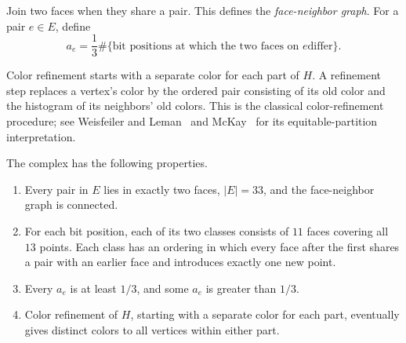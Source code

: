 Join two faces when they share a pair. This defines the
\emph{face-neighbor graph}. For a pair $e\in E$, define
\begin{equation}
 a_e=\frac{1}{3}\#\{\text{bit positions at which the two faces on $e$
 differ}\}.
 \label{eq:complex-separation}
\end{equation}

Color refinement starts with a separate color for each part of $H$.
A refinement step replaces a vertex's color by the ordered pair
consisting of its old color and the histogram of its neighbors' old
colors. This is the classical color-refinement procedure; see
Weisfeiler and Leman~\cite{weisfeilerleman1968} and
McKay~\cite[Sections~2.3--2.6]{mckay1981} for its equitable-partition interpretation.

\begin{proposition}
\label{prop:complex}
The complex has the following properties.
\begin{enumerate}
\item Every pair in $E$ lies in exactly two faces, $|E|=33$, and the
face-neighbor graph is connected.
\item For each bit position, each of its two classes consists of
$11$ faces covering all $13$ points. Each class has an ordering in
which every face after the first shares a pair with an earlier face
and introduces exactly one new point.
\item Every $a_e$ is at least $1/3$, and some $a_e$ is greater than
$1/3$.
\item Color refinement of $H$, starting with a separate color for each
part, eventually gives distinct colors to all vertices within either
part.
\end{enumerate}
\end{proposition}

